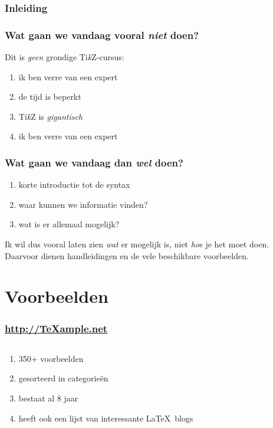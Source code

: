 \documentclass[]{beamer}
\newcommand\TikZ{Ti\textit{k}Z\xspace}
\begin{document}
\begin{frame}
  \frametitle{Inleiding}
\end{frame}

\begin{frame}
  \frametitle{Wat gaan we vandaag vooral \emph{niet} doen?}

  Dit is \emph{geen} grondige \TikZ-cursus:
  \begin{enumerate}
    \item ik ben verre van een expert
    \item de tijd is beperkt
    \item \TikZ is \emph{gigantisch}
    \item\pause ik ben verre van een expert
  \end{enumerate}
\end{frame}

\begin{frame}
  \frametitle{Wat gaan we vandaag dan \emph{wel} doen?}

  \begin{enumerate}
    \item korte introductie tot de syntax
    \item waar kunnen we informatie vinden?
    \item wat is er allemaal mogelijk?
  \end{enumerate}
  Ik wil dus vooral laten zien \emph{wat} er mogelijk is, niet \emph{hoe} je het moet doen. Daarvoor dienen handleidingen en de vele beschikbare voorbeelden.
\end{frame}

\section{Voorbeelden}

\begin{frame}
  \frametitle{\url{http://TeXample.net}}

  \begin{columns}
    \begin{column}{.4\textwidth}
      \begin{enumerate}
        \item 350+ voorbeelden
        \item gesorteerd in categorie\"en
        \item bestaat al 8 jaar
        \item heeft ook een lijst van interessante \LaTeX\ blogs
      \end{enumerate}
    \end{column}

    \begin{column}{.6\textwidth}
      \begin{flushright}
        
      \end{flushright}
    \end{column}
  \end{columns}
\end{frame}
\end{document}

